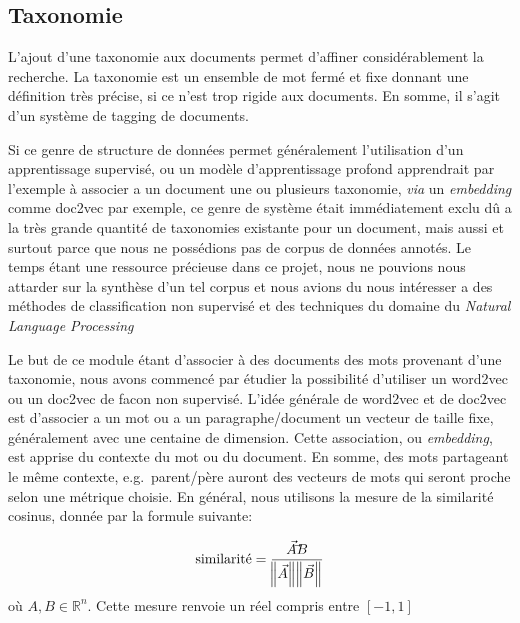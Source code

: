 
\subsection{Taxonomie}%
L'ajout d'une taxonomie aux documents permet d'affiner considérablement la recherche.
La taxonomie est un ensemble de mot fermé et fixe donnant une définition très précise, si ce n'est trop rigide aux documents.
En somme, il s'agit d'un système de tagging de documents. 

Si ce genre de structure de données permet généralement l'utilisation d'un apprentissage supervisé, ou un modèle d'apprentissage profond apprendrait par l'exemple à associer a un document une ou plusieurs taxonomie, \textit{via} un \textit{embedding} comme doc2vec\cite{doc2vec} par exemple, ce genre de système était immédiatement exclu dû a la très grande quantité de taxonomies existante pour un document, mais aussi et surtout parce que nous ne possédions pas de corpus de données annotés.
Le temps étant une ressource précieuse dans ce projet, nous ne pouvions nous attarder sur la synthèse d'un tel corpus et nous avions du nous intéresser a des méthodes de classification non supervisé et des techniques du domaine du \textit{Natural Language Processing}

Le but de ce module étant d'associer à des documents des mots provenant d'une taxonomie, nous avons commencé par étudier la possibilité d'utiliser un word2vec\cite{word2vec} ou un doc2vec de facon non supervisé.
L'idée générale de word2vec et de doc2vec est d'associer a un mot ou a un paragraphe/document un vecteur de taille fixe, généralement avec une centaine de dimension. Cette association, ou \textit{embedding}, est apprise du contexte du mot ou du document.
En somme, des mots partageant le même contexte, e.g.\ parent/père auront des vecteurs de mots qui seront proche selon une métrique choisie.
En général, nous utilisons la mesure de la similarité cosinus, donnée par la formule suivante:

\begin{equation}
	\text{similarité} = \frac{\vec{A} \dot \vec{B}}{\norm{\vec{A}}\norm{\vec{B}}}
\end{equation}
où $A, B  \in \mathbb{R}^n$. Cette mesure renvoie un réel compris entre $[-1, 1]$

